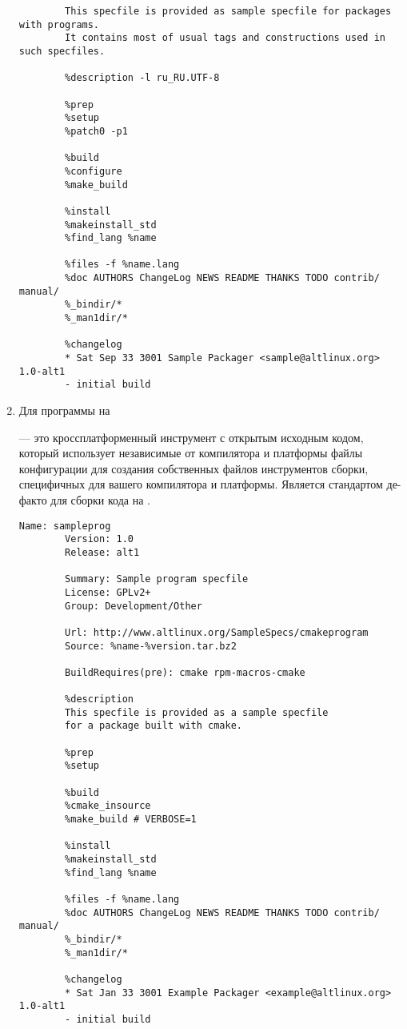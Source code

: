 \begin{enumerate}
\begin{Verbatim}[breaklines=true,breakanywhere=true,xleftmargin=-2.95cm]
		%description
		This specfile is provided as sample specfile for packages with programs.
		It contains most of usual tags and constructions used in such specfiles.
		
		%description -l ru_RU.UTF-8
		
		%prep
		%setup
		%patch0 -p1
		
		%build
		%configure
		%make_build
		
		%install
		%makeinstall_std
		%find_lang %name
		
		%files -f %name.lang
		%doc AUTHORS ChangeLog NEWS README THANKS TODO contrib/ manual/
		%_bindir/*
		%_man1dir/*
		
		%changelog
		* Sat Sep 33 3001 Sample Packager <sample@altlinux.org> 1.0-alt1
		- initial build
	\end{Verbatim}
	
	\item Для программы на 
	
	 --- это кроссплатформенный инструмент с открытым исходным кодом, который использует независимые от компилятора и платформы файлы конфигурации для создания собственных файлов инструментов сборки, специфичных для вашего компилятора и платформы. Является стандартом де-факто для сборки кода на .
	\begin{Verbatim}[breaklines=true,breakanywhere=true,xleftmargin=-2.95cm]
		Name: sampleprog
		Version: 1.0
		Release: alt1
		
		Summary: Sample program specfile
		License: GPLv2+
		Group: Development/Other
		
		Url: http://www.altlinux.org/SampleSpecs/cmakeprogram
		Source: %name-%version.tar.bz2
		
		BuildRequires(pre): cmake rpm-macros-cmake
		
		%description
		This specfile is provided as a sample specfile
		for a package built with cmake.
		
		%prep
		%setup
		
		%build
		%cmake_insource
		%make_build # VERBOSE=1
		
		%install
		%makeinstall_std
		%find_lang %name
		
		%files -f %name.lang
		%doc AUTHORS ChangeLog NEWS README THANKS TODO contrib/ manual/
		%_bindir/*
		%_man1dir/*
		
		%changelog
		* Sat Jan 33 3001 Example Packager <example@altlinux.org> 1.0-alt1
		- initial build
	\end{Verbatim}
	

\end{enumerate}
